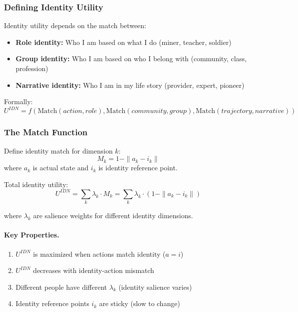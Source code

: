\subsubsection{Defining Identity Utility}

Identity utility depends on the match between:
\begin{itemize}
    \item \textbf{Role identity:} Who I am based on what I do (miner, teacher, soldier)
    \item \textbf{Group identity:} Who I am based on who I belong with (community, class, profession)
    \item \textbf{Narrative identity:} Who I am in my life story (provider, expert, pioneer)
\end{itemize}

Formally:
\begin{equation}
U^{IDN} = f\left(\text{Match}(action, role), \text{Match}(community, group), \text{Match}(trajectory, narrative)\right)
\label{eq:identity-components}
\end{equation}

\subsubsection{The Match Function}

Define identity match for dimension $k$:
\begin{equation}
M_k = 1 - \|a_k - i_k\|
\end{equation}
where $a_k$ is actual state and $i_k$ is identity reference point.

Total identity utility:
\begin{equation}
U^{IDN} = \sum_k \lambda_k \cdot M_k = \sum_k \lambda_k \cdot (1 - \|a_k - i_k\|)
\label{eq:identity-utility}
\end{equation}

where $\lambda_k$ are salience weights for different identity dimensions.

\paragraph{Key Properties.}
\begin{enumerate}
    \item $U^{IDN}$ is maximized when actions match identity ($a = i$)
    \item $U^{IDN}$ decreases with identity-action mismatch
    \item Different people have different $\lambda_k$ (identity salience varies)
    \item Identity reference points $i_k$ are sticky (slow to change)
\end{enumerate}

